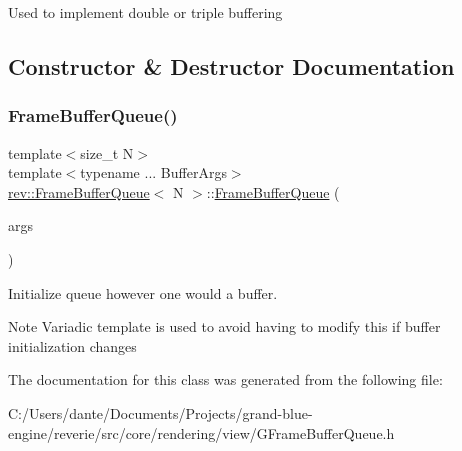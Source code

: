 Used to implement double or triple buffering 

\subsection{Constructor \& Destructor Documentation}
\mbox{\label{classrev_1_1_frame_buffer_queue_ad4427af30c73241dcf61d9a6f8adff3e}} 
\subsubsection{\texorpdfstring{FrameBufferQueue()}{FrameBufferQueue()}}
{\footnotesize\ttfamily template$<$size\+\_\+t N$>$ \\
template$<$typename ... Buffer\+Args$>$ \\
\mbox{\hyperlink{classrev_1_1_frame_buffer_queue}{rev\+::\+Frame\+Buffer\+Queue}}$<$ N $>$\+::\mbox{\hyperlink{classrev_1_1_frame_buffer_queue}{Frame\+Buffer\+Queue}} (\begin{DoxyParamCaption}\item[{Buffer\+Args \&\&...}]{args }\end{DoxyParamCaption})\hspace{0.3cm}{\ttfamily [inline]}}



Initialize queue however one would a buffer. 

\begin{DoxyNote}{Note}
Variadic template is used to avoid having to modify this if buffer initialization changes 
\end{DoxyNote}


The documentation for this class was generated from the following file\+:\begin{DoxyCompactItemize}
\item 
C\+:/\+Users/dante/\+Documents/\+Projects/grand-\/blue-\/engine/reverie/src/core/rendering/view/G\+Frame\+Buffer\+Queue.\+h\end{DoxyCompactItemize}
